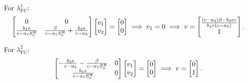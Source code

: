 \documentclass[
    8pt,
    aspectratio=1610,
    c,
    intlimits,
    leqno,
    professionalfonts,
]{beamer}
\begin{document}
\begin{frame}
	For $\lambda^{1}_{\text{FC}}$:
	\begin{equation*}
		\begin{bmatrix}
			0                                      & 0                                                            \\[.5\baselineskip]
			\frac{b_{1}e}{c-a_{1}S^{R}_{\text{o}}} & \frac{\beta}{c-a_{1}S^{R}_{\text{o}}}+\frac{b_{3}e}{c-a_{3}}
		\end{bmatrix}
		\begin{bmatrix}
			v_{1} \\
			v_{2}
		\end{bmatrix}=
		\begin{bmatrix}
			0 \\
			0
		\end{bmatrix}\implies
		v_{1}=0\implies
		v=\begin{bmatrix}
			\frac{
			\left(c-a_{3}\right)\beta-b_{3}ec
			}{b_{1}e\left(c-a_{3}\right)} \\
			1
		\end{bmatrix}.
	\end{equation*}

	For $\lambda^{2}_{\text{FC}}$:
	\begin{equation*}
		\begin{bmatrix}
			-\frac{b_{3}e}{c-a_{3}}-\frac{\beta}{c-a_{1}S^{R}_{\text{o}}} & 0 \\[.5\baselineskip]
			\frac{b_{1}e}{c-a_{1}S^{R}_{\text{o}}}                        & 0
		\end{bmatrix}
		\begin{bmatrix}
			v_{1} \\
			v_{2}
		\end{bmatrix}=
		\begin{bmatrix}
			0 \\
			0
		\end{bmatrix}\implies
		v=\begin{bmatrix}
			0 \\
			1
		\end{bmatrix}.
	\end{equation*}
\end{frame}
\end{document}
